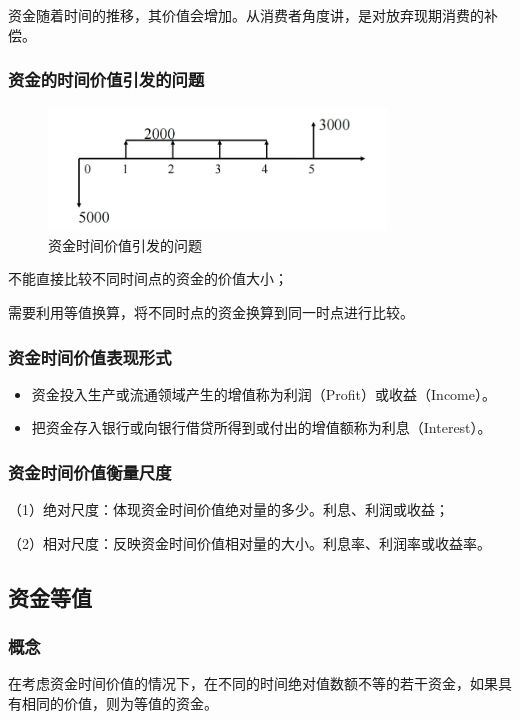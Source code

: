 资金随着时间的推移，其价值会增加。从消费者角度讲，是对放弃现期消费的补偿。

\subsubsection{资金的时间价值引发的问题}

\begin{figure}[H]
    \centering
    \includegraphics[width=0.8\textwidth]{image/资金时间价值引发的问题.png}
    \caption{资金时间价值引发的问题}
    \label{fig:3}
\end{figure}

不能直接比较不同时间点的资金的价值大小；

需要利用等值换算，将不同时点的资金换算到同一时点进行比较。

\subsubsection{资金时间价值表现形式}
\begin{itemize}
    \item 资金投入生产或流通领域产生的增值称为利润（Profit）或收益（Income）。
    \item 把资金存入银行或向银行借贷所得到或付出的增值额称为利息（Interest）。
\end{itemize}

\subsubsection{资金时间价值衡量尺度}
（1）绝对尺度：体现资金时间价值绝对量的多少。利息、利润或收益；

（2）相对尺度：反映资金时间价值相对量的大小。利息率、利润率或收益率。

\subsection{资金等值}
\subsubsection{概念}
在考虑资金时间价值的情况下，在不同的时间绝对值数额不等的若干资金，如果具有相同的价值，则为等值的资金。

